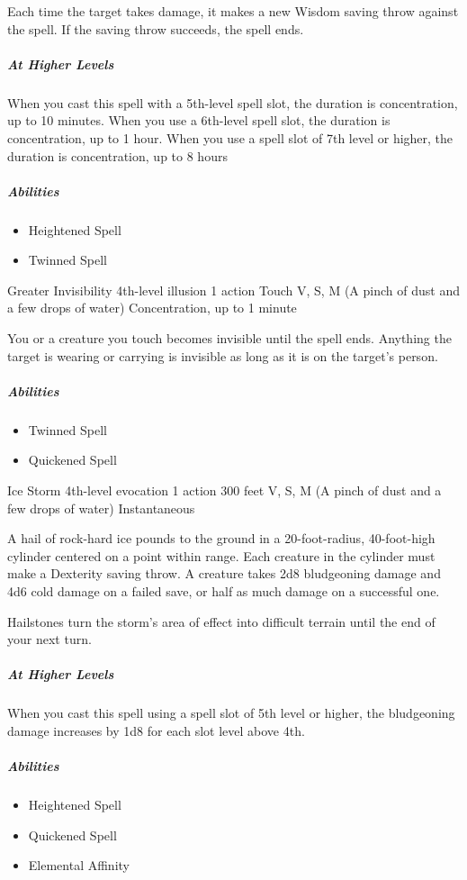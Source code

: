 \documentclass[a4paper,openany,twocolumn]{book}
\begin{document}
Each time the target takes damage, it makes a new Wisdom saving throw against the spell. If the saving throw succeeds, the spell ends.
    
\subparagraph*{At Higher Levels} When you cast this spell with a 5th-level spell slot, the duration is concentration, up to 10 minutes.  When you use a 6th-level spell slot, the duration is concentration, up to 1 hour. When you use a spell slot of 7th level or higher, the duration is concentration, up to 8 hours

\subparagraph*{Abilities}
\begin{itemize}
  \item Heightened Spell
  \item Twinned Spell
\end{itemize}

\DndSpellHeader
  {Greater Invisibility}
  {4th-level illusion}
  {1 action}
  {Touch}
  {V, S, M (A pinch of dust and a few drops of water)}
  {Concentration, up to 1 minute}

You or a creature you touch becomes invisible until the spell ends. Anything the target is wearing or carrying is invisible as long as it is on the target's person.

\subparagraph*{Abilities}
\begin{itemize}
  \item Twinned Spell
  \item Quickened Spell
\end{itemize}

\DndSpellHeader
  {Ice Storm}
  {4th-level evocation}
  {1 action}
  {300 feet}
  {V, S, M (A pinch of dust and a few drops of water)}
  {Instantaneous}

A hail of rock-hard ice pounds to the ground in a 20-foot-radius, 40-foot-high cylinder centered on a point within range.  Each creature in the cylinder must make a Dexterity saving throw. A creature takes 2d8 bludgeoning damage and 4d6 cold damage on a failed save, or half as much damage on a successful one.
    
Hailstones turn the storm's area of effect into difficult terrain until the end  of your next turn.
    
\subparagraph*{At Higher Levels} When you cast this spell using a spell slot of 5th level or higher, the bludgeoning damage increases by 1d8 for each slot level above 4th.

\subparagraph*{Abilities}
\begin{itemize}
  \item Heightened Spell
  \item Quickened Spell
  \item Elemental Affinity
\end{itemize}
\end{document}
